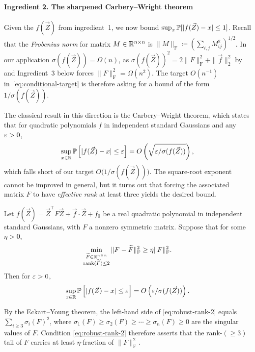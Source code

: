 \paragraph{Ingredient 2. The sharpened Carbery--Wright theorem}

Given the $f(\vec Z)$ from ingredient~1, we now bound $\sup_x \mathbb{P}[|f(\vec Z) - x| \leq 1]$. Recall that the \textit{Frobenius norm} for matrix $M \in \mathbb{R}^{n \times n}$ is $\|M\|_{\mathrm{F}} \coloneqq \left(\sum_{i, j} M_{ij}^2\right)^{1/2}$. In our application $\sigma(f(\vec Z)) = \Omega(n)$, as $\sigma(f(\vec Z))^2 = 2\|F\|_{\mathrm{F}}^2 + \|\vec f\|_2^2$ by \cite[Lemma~11.1(2)]{Kwan_2023} and Ingredient~3 below forces $\|F\|_{\mathrm{F}}^2 = \Omega(n^2)$. The target $O(n^{-1})$ in~\eqref{eq:conditional-target} is therefore asking for a bound of the form $1/\sigma(f(\vec Z))$.

The classical result in this direction is the Carbery--Wright theorem, which states that for quadratic polynomials $f$ in independent standard Gaussians and any $\varepsilon > 0$,
\[
  \sup_{x \in \mathbb{R}} \mathbb{P}\left[|f(\vec Z) - x| \leq \varepsilon\right] = O\left(\sqrt{\varepsilon / \sigma(f(\vec Z))}\right),
\]
which falls short of our target $O\bigl(1/\sigma(f(\vec Z))\bigr)$. The square-root exponent cannot be improved in general, but it turns out that forcing the associated matrix $F$ to have \textit{effective rank} at least three yields the desired bound.

\begin{theorem}
\label{thm:sharp-CW}
  Let $f(\vec Z) = \vec Z^{\top} F \vec Z + \vec f \cdot \vec Z + f_0$ be a real quadratic polynomial in independent standard Gaussians, with $F$ a nonzero symmetric matrix. Suppose that for some $\eta > 0$,
  \begin{equation}
  \label{eq:robust-rank-2}
    \min_{\substack{\widetilde F \in \mathbb{R}^{n \times n} \\ \mathrm{rank}(\widetilde F) \leq 2}} \|F - \widetilde F\|_{\mathrm{F}}^2 \geq \eta \|F\|_{\mathrm{F}}^2.
  \end{equation}
  Then for $\varepsilon > 0$,
  \[
    \sup_{x \in \mathbb{R}} \mathbb{P}\left[|f(\vec Z) - x| \leq \varepsilon\right] = O\left(\varepsilon/\sigma(f(\vec Z))\right).
  \]
\end{theorem}

By the Eckart--Young theorem, the left-hand side of \eqref{eq:robust-rank-2} equals $\sum_{i \geq 3} \sigma_i(F)^2$, where $\sigma_1(F) \geq \sigma_2(F) \geq \cdots \geq \sigma_n(F) \geq 0$ are the singular values of $F$. Condition \eqref{eq:robust-rank-2} therefore asserts that the rank-$(\geq 3)$ tail of $F$ carries at least $\eta$-fraction of $\|F\|_{\mathrm{F}}^2$. 

